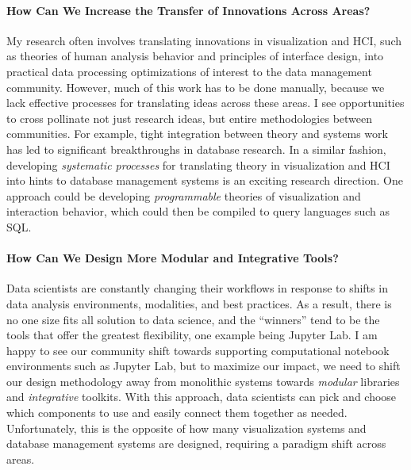 \documentclass[10pt]{article}
\begin{document}
\paragraph{How Can We Increase the Transfer of Innovations Across Areas?}
My research often involves translating innovations in visualization and HCI, such as theories of human analysis behavior and principles of interface design, into practical data processing optimizations of interest to the data management community. However, much of this work has to be done manually, because we lack effective processes for translating ideas across these areas.
I see opportunities to cross pollinate not just research ideas, but entire methodologies between communities.
For example, tight integration between theory and systems work has led to significant breakthroughs in database research.
In a similar fashion, developing \emph{systematic processes} for translating theory in visualization and HCI into hints to database management systems is an exciting research direction. One approach could be developing \emph{programmable} theories of visualization and interaction behavior, which could then be compiled to query languages such as SQL.

\paragraph{How Can We Design More Modular and Integrative Tools?}
Data scientists are constantly changing their workflows in response to shifts in data analysis environments, modalities, and best practices. As a result, there is no one size fits all solution to data science, and the ``winners'' tend to be the tools that offer the greatest flexibility, one example being Jupyter Lab. I am happy to see our community shift towards supporting computational notebook environments such as Jupyter Lab, 
but to maximize our impact, we need to shift our design methodology away from monolithic systems towards \emph{modular} libraries and \emph{integrative} toolkits. 
With this approach, data scientists can pick and choose which components to use and easily connect them together as needed. Unfortunately, this is the opposite of how many visualization systems and database management systems are designed, requiring a paradigm shift across areas.
\end{document}
